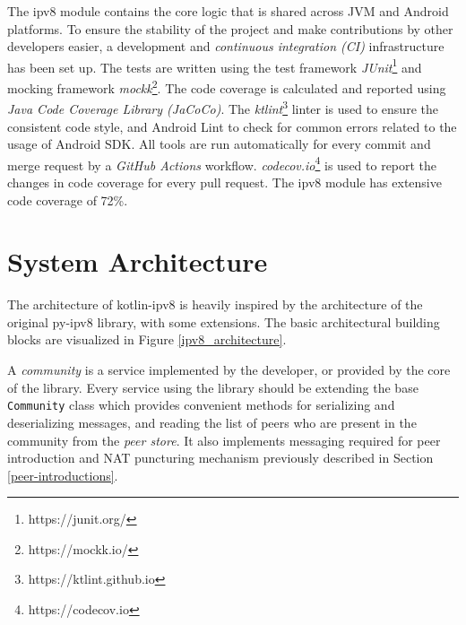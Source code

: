 The ipv8 module contains the core logic that is shared across JVM and Android platforms. To ensure the stability of the project and make contributions by other developers easier, a development and \textit{continuous integration (CI)} infrastructure has been set up. The tests are written using the test framework \textit{JUnit}\footnote{https://junit.org/} and mocking framework \textit{mockk}\footnote{https://mockk.io/}. The code coverage is calculated and reported using \textit{Java Code Coverage Library (JaCoCo)}. The \textit{ktlint}\footnote{https://ktlint.github.io} linter is used to ensure the consistent code style, and Android Lint to check for common errors related to the usage of Android SDK. All tools are run automatically for every commit and merge request by a \textit{GitHub Actions} workflow. \textit{codecov.io}\footnote{https://codecov.io} is used to report the changes in code coverage for every pull request. The ipv8 module has extensive code coverage of 72\%.




\section{System Architecture}

The architecture of kotlin-ipv8 is heavily inspired by the architecture of the original py-ipv8 library, with some extensions. %
The basic architectural building blocks are visualized in Figure \ref{ipv8_architecture}.

A \textit{community} is a service implemented by the developer, or provided by the core of the library. Every service using the library should be extending the base \texttt{Community} class which provides convenient methods for serializing and deserializing messages, and reading the list of peers who are present in the community from the \textit{peer store}. It also implements messaging required for peer introduction and NAT puncturing mechanism previously described in Section \ref{peer-introductions}.

